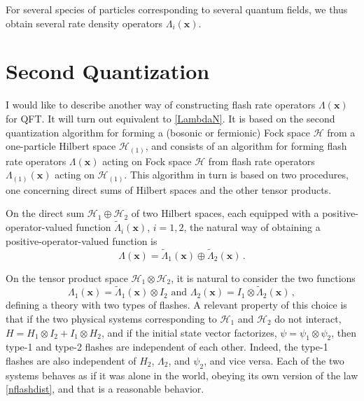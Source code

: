 \documentclass[12pt]{article}
\newcommand{\Hilbert}{\mathscr{H}}
\newcommand{\vx}{\boldsymbol{x}}
\newcommand{\1}{1}
\newcommand{\z}[1]{{#1}}
\begin{document}
For several species \z{of particles} corresponding to several \z{quantum} fields, we \z{thus} obtain several rate density operators $\Lambda_i(\vx)$.



\section{Second Quantization}

I would like to describe another way of constructing flash rate operators $\Lambda(\vx)$ for QFT. It will turn out equivalent to \eqref{LambdaN}. It is based on the second quantization algorithm for forming a (bosonic or fermionic) Fock space $\Hilbert$ from a one-particle Hilbert space $\Hilbert_{(1)}$, and consists of an algorithm for forming flash rate operators $\Lambda(\vx)$ acting on Fock space $\Hilbert$ from flash rate operators $\Lambda_{(1)}(\vx)$ acting on $\Hilbert_{(1)}$. This algorithm in turn is based on two procedures, one concerning direct sums of Hilbert spaces and the other tensor products.

On the direct sum $\Hilbert_{1} \oplus \Hilbert_{2}$ of two Hilbert spaces, each equipped with a positive-operator-valued function $\tilde\Lambda_{i}(\vx)$, $i=1,2$, the natural way of obtaining a positive-operator-valued function is
\begin{equation}\label{Lambdasum}
  \Lambda(\vx) = \tilde\Lambda_{1}(\vx) \oplus \tilde\Lambda_{2}(\vx) \,.
\end{equation}

On the tensor product space $\Hilbert_{1} \otimes \Hilbert_{2}$, it is natural to consider the two functions 
\begin{equation}\label{2Lambdas}
  \Lambda_1 (\vx) = \tilde\Lambda_{1}(\vx) \otimes I_{2}\text{ and }
  \Lambda_2(\vx) = I_{1} \otimes \tilde\Lambda_{2}(\vx)\,, 
\end{equation}
defining a theory with two types of flashes. A relevant property of this choice is that if the two physical systems corresponding to $\Hilbert_{1}$ and $\Hilbert_{2}$ do not interact, $H = H_{1} \otimes I_{2} + I_{1} \otimes H_{2}$, and if the initial state vector factorizes, $\psi = \psi_{1} \otimes \psi_{2}$, then type-1 and type-2 flashes are independent of each other. Indeed, the type-1 flashes are also independent of $H_{2}$, $\Lambda_{2}$, and $\psi_{2}$, and vice versa. Each of the two systems behaves as if it was alone in the world, obeying its own version of the law \eqref{nflashdist}, and that is a reasonable behavior. 
\end{document}
